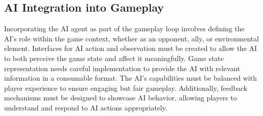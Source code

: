 \subsection{AI Integration into Gameplay}
Incorporating the AI agent as part of the gameplay loop involves defining the AI's role within the game context, whether as an opponent, ally, or environmental element. 
Interfaces for AI action and observation must be created to allow the AI to both perceive the game state and affect it meaningfully. 
Game state representation needs careful implementation to provide the AI with relevant information in a consumable format. The AI's capabilities must be balanced with player experience to ensure engaging but fair gameplay. 
Additionally, feedback mechanisms must be designed to showcase AI behavior, allowing players to understand and respond to AI actions appropriately.
